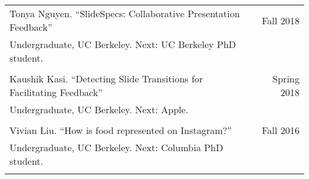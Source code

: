 \begin{longtable}{Xr}
	Tonya Nguyen. ``SlideSpecs: Collaborative Presentation Feedback'' & Fall 2018 \\
	Undergraduate, UC Berkeley. Next: UC Berkeley PhD student. &  \\
	\\

	Kaushik Kasi. ``Detecting Slide Transitions for Facilitating Feedback'' & Spring 2018 \\
	Undergraduate, UC Berkeley. Next: Apple. &  \\
	\\

	Vivian Liu. ``How is food represented on Instagram?'' & Fall 2016 \\
	Undergraduate, UC Berkeley. Next: Columbia PhD student. &  \\
	\\

\end{longtable}